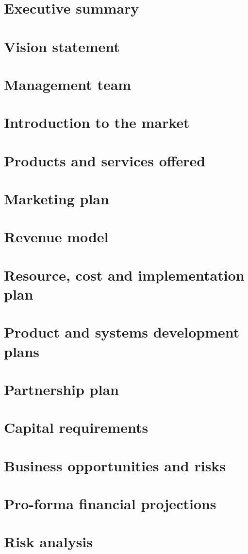 \documentclass{article}
\begin{document}
\section{Executive summary}
\section{Vision statement}
\section{Management team}
\section{Introduction to the market}
\section{Products and services offered}
\section{Marketing plan}
\section{Revenue model}
\section{Resource, cost and implementation plan}
\section{Product and systems development plans}
\section{Partnership plan}
\section{Capital requirements}
\section{Business opportunities and risks}
\section{Pro-forma financial projections}
\section{Risk analysis}
\end{document}
